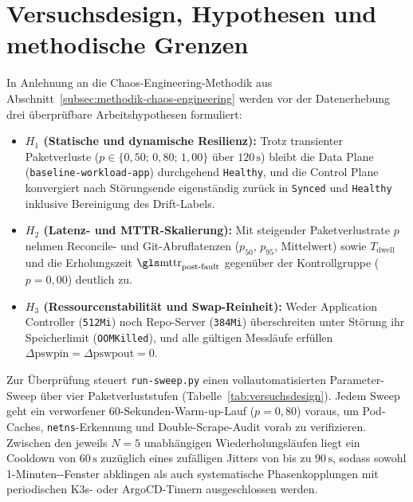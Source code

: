 \section{Versuchsdesign, Hypothesen und methodische Grenzen}
\label{sec:versuchsdesign-hypothesen}

In Anlehnung an die Chaos-Engineering-Methodik aus Abschnitt~\ref{subsec:methodik-chaos-engineering} werden vor der Datenerhebung drei überprüfbare Arbeitshypothesen formuliert:

\begin{itemize}
\item \textbf{$H_1$ (Statische und dynamische Resilienz):} Trotz transienter Paketverluste ($p \in \{0{,}50;\, 0{,}80;\, 1{,}00\}$ über $120\,\text{s}$) bleibt die Data Plane (\texttt{baseline-workload-app}) durchgehend \texttt{Healthy}, und die Control Plane konvergiert nach Störungsende eigenständig zurück in \texttt{Synced} und \texttt{Healthy} inklusive Bereinigung des Drift-Labels.
\item \textbf{$H_2$ (Latenz- und MTTR-Skalierung):} Mit steigender Paketverlustrate $p$ nehmen Reconcile- und Git-Abruflatenzen ($p_{50}$, $p_{95}$, Mittelwert) sowie $T_{\text{dwell}}$ und die Erholungszeit $\text{\gl{mttr}}_{\text{post-fault}}$ gegenüber der Kontrollgruppe ($p = 0{,}00$) deutlich zu.
\item \textbf{$H_3$ (Ressourcenstabilität und Swap-Reinheit):} Weder Application Controller (\texttt{512Mi}) noch Repo-Server (\texttt{384Mi}) überschreiten unter Störung ihr Speicherlimit (\texttt{OOMKilled}), und alle gültigen Messläufe erfüllen $\Delta\text{pswpin} = \Delta\text{pswpout} = 0$.
\end{itemize}

Zur Überprüfung steuert \texttt{run-sweep.py} einen vollautomatisierten Parameter-Sweep über vier Paketverluststufen (Tabelle~\ref{tab:versuchsdesign}). Jedem Sweep geht ein verworfener 60-Sekunden-Warm-up-Lauf ($p = 0{,}80$) voraus, um Pod-Caches, \texttt{netns}-Erkennung und Double-Scrape-Audit vorab zu verifizieren. Zwischen den jeweils $N = 5$ unabhängigen Wiederholungsläufen liegt ein Cooldown von $60\,\text{s}$ zuzüglich eines zufälligen Jitters von bis zu $90\,\text{s}$, sodass sowohl 1-Minuten--Fenster abklingen als auch systematische Phasenkopplungen mit periodischen K3s- oder ArgoCD-Timern ausgeschlossen werden.

